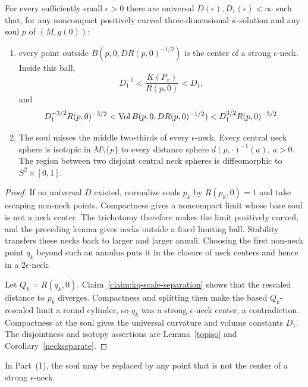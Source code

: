 \begin{proposition}\label{prop:uniform-neck-structure-constants}
\label{uniformD}

For every sufficiently small $\epsilon>0$ there are universal
$D(\epsilon),D_1(\epsilon)<\infty$ such that, for any noncompact
positively curved three-dimensional $\kappa$-solution and any soul
$p$ of $(M,g(0))$:
\begin{enumerate}
\item[(1)] every point outside
$B(p,0,DR(p,0)^{-1/2})$ is the center of a strong
$\epsilon$-neck. Inside this ball,
\[
 D_1^{-1}<\frac{K(P_x)}{R(p,0)}<D_1,
\]
and
\[
 D_1^{-3/2}R(p,0)^{-3/2}
 <\operatorname{Vol} B(p,0,DR(p,0)^{-1/2})
 <D_1^{3/2}R(p,0)^{-3/2}.
\]
\item[(2)] The soul misses the middle two-thirds of every
$\epsilon$-neck. Every central neck sphere is isotopic in
$M\setminus\{p\}$ to every distance sphere $d(p,\cdot)^{-1}(a)$,
$a>0$. The region between two disjoint central neck spheres is
diffeomorphic to $S^2\times[0,1]$.
\end{enumerate}
\end{proposition}
\begin{proof}
\sketch
{}
If no universal $D$ existed, normalize souls $p_k$ by
$R(p_k,0)=1$ and take escaping non-neck points. Compactness gives a
noncompact limit whose base soul is not a neck center. The trichotomy
therefore makes the limit positively curved, and the preceding lemma
gives necks outside a fixed limiting ball. Stability transfers these
necks back to larger and larger annuli. Choosing the first
non-neck point $q_k$ beyond such an annulus puts it in the closure of
neck centers and hence in a $2\epsilon$-neck.

Let $Q_k=R(q_k,0)$. Claim~\ref{claim:kq-scale-separation} shows that
the rescaled distance to $p_k$ diverges. Compactness and splitting
then make the based $Q_k$-rescaled limit a round cylinder, so $q_k$
was a strong $\epsilon$-neck center, a contradiction. Compactness at
the soul gives the universal curvature and volume constants $D_1$.
The disjointness and isotopy assertions are Lemma~\ref{topiso} and
Corollary~\ref{neckseparate}.
\end{proof}

\begin{remark}\label{rem:uniform-neck-structure-basepoint-remark}

In Part~(1), the soul may be replaced by any point that is not the
center of a strong $\epsilon$-neck.
\end{remark}

